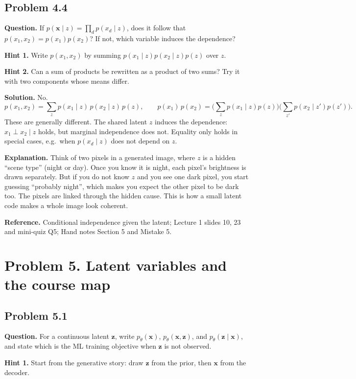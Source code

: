 \documentclass[11pt]{article}
\begin{document}
\subsection*{Problem 4.4}
\textbf{Question.} If $p(\mathbf{x}\mid z) = \prod_d p(x_d\mid z)$, does it follow that $p(x_1,x_2) = p(x_1)p(x_2)$? If not, which variable induces the dependence?

\textbf{Hint 1.} Write $p(x_1,x_2)$ by summing $p(x_1\mid z)p(x_2\mid z)p(z)$ over $z$.

\textbf{Hint 2.} Can a sum of products be rewritten as a product of two sums? Try it with two components whose means differ.

\textbf{Solution.} No.
\[
p(x_1,x_2) = \sum_{z} p(x_1\mid z)\,p(x_2\mid z)\,p(z),
\qquad
p(x_1)\,p(x_2) = \Big(\sum_z p(x_1\mid z)p(z)\Big)\Big(\sum_{z'} p(x_2\mid z')p(z')\Big).
\]
These are generally different. The shared latent $z$ induces the dependence: $x_1 \perp x_2 \mid z$ holds, but marginal independence does not. Equality only holds in special cases, e.g.\ when $p(x_d\mid z)$ does not depend on $z$.

\textbf{Explanation.} Think of two pixels in a generated image, where $z$ is a hidden ``scene type'' (night or day). Once you know it is night, each pixel's brightness is drawn separately. But if you do not know $z$ and you see one dark pixel, you start guessing ``probably night'', which makes you expect the other pixel to be dark too. The pixels are linked through the hidden cause. This is how a small latent code makes a whole image look coherent.

\textbf{Reference.} Conditional independence given the latent; Lecture 1 slides 10, 23 and mini-quiz Q5; Hand notes Section 5 and Mistake 5.

\section*{Problem 5. Latent variables and the course map}

\subsection*{Problem 5.1}
\textbf{Question.} For a continuous latent $\mathbf{z}$, write $p_\theta(\mathbf{x})$, $p_\theta(\mathbf{x},\mathbf{z})$, and $p_\theta(\mathbf{z}\mid\mathbf{x})$, and state which is the ML training objective when $\mathbf{z}$ is not observed.

\textbf{Hint 1.} Start from the generative story: draw $\mathbf{z}$ from the prior, then $\mathbf{x}$ from the decoder.
\end{document}
